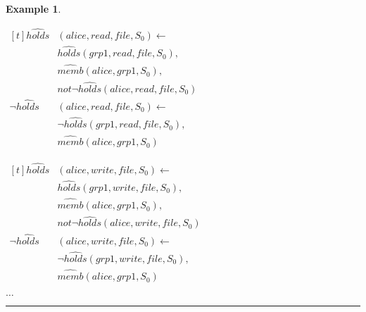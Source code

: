 \documentclass[11pt, twocolumn]{article}
\newtheorem{vexmpl}{Example}
\newenvironment{vexample}
  {\begin{vexmpl}\rm}
  {\rule{2mm}{2mm}\end{vexmpl}}
\begin{document}
\begin{vexample}
\begin{enumerate}
              \begin{math}
                \begin{aligned}[t]
                  \hat{holds}&(alice, read, file, S_{0}) \leftarrow \\
                  & \hat{holds}(grp1, read, file, S_{0}), \\
                  & \hat{memb}(alice, grp1, S_{0}), \\
                  & not \lnot \hat{holds}(alice, read, file, S_{0}) \\
                  \lnot \hat{holds}&(alice, read, file, S_{0}) \leftarrow \\
                  & \lnot \hat{holds}(grp1, read, file, S_{0}), \\
                  & \hat{memb}(alice, grp1, S_{0})
                \end{aligned}
              \end{math}

              \begin{math}
                \begin{aligned}[t]
                  \hat{holds}&(alice, write, file, S_{0}) \leftarrow \\
                  & \hat{holds}(grp1, write, file, S_{0}), \\
                  & \hat{memb}(alice, grp1, S_{0}), \\
                  & not \lnot \hat{holds}(alice, write, file, S_{0}) \\
                  \lnot \hat{holds}&(alice, write, file, S_{0}) \leftarrow \\
                  & \lnot \hat{holds}(grp1, write, file, S_{0}), \\
                  & \hat{memb}(alice, grp1, S_{0})
                \end{aligned}
              \end{math}

              \hspace{1cm} $\ldots$


\end{enumerate}
\end{vexample}
\end{document}
